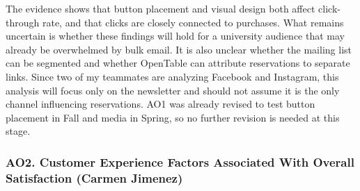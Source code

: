 \documentclass[
  12pt,
  letterpaper,
  DIV=11,
  numbers=noendperiod]{scrartcl}
\begin{document}
The evidence shows that button placement and visual design both affect
click-through rate, and that clicks are closely connected to purchases.
What remains uncertain is whether these findings will hold for a
university audience that may already be overwhelmed by bulk email. It is
also unclear whether the mailing list can be segmented and whether
OpenTable can attribute reservations to separate links. Since two of my
teammates are analyzing Facebook and Instagram, this analysis will focus
only on the newsletter and should not assume it is the only channel
influencing reservations. AO1 was already revised to test button
placement in Fall and media in Spring, so no further revision is needed
at this stage.

\subsubsection{AO2. Customer Experience Factors Associated With Overall
Satisfaction (Carmen
Jimenez)}\label{ao2.-customer-experience-factors-associated-with-overall-satisfaction-carmen-jimenez}
\end{document}
